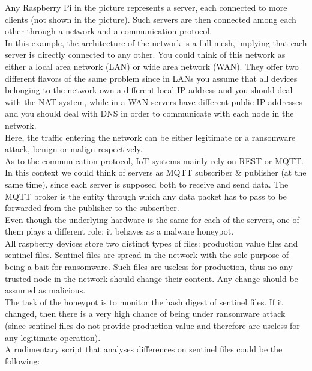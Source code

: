 \noindent Any Raspberry Pi in the picture represents a server, each connected to more clients (not shown in the picture). Such servers are then connected among each other through a network and a communication protocol.\\
In this example, the architecture of the network is a full mesh, implying that each server is directly connected to any other. You could think of this network as either a local area network (LAN) or wide area network (WAN). They offer two different flavors of the same problem since in LANs you assume that all devices belonging to the network own a different local IP address and you should deal with the NAT system, while in a WAN servers have different public IP addresses and you should deal with DNS in order to communicate with each node in the network. \\ 
Here, the traffic entering the network can be either legitimate or a ransomware attack, benign or malign respectively.\\
As to the communication protocol, IoT systems mainly rely on REST or MQTT. In this context we could think of servers as MQTT subscriber \& publisher (at the same time), since each server is supposed both to receive and send data. The MQTT broker is the entity through which any data packet has to pass to be forwarded from the publisher to the subscriber.\\
Even though the underlying hardware is the same for each of the servers, one of them plays a different role: it behaves as a malware honeypot.\\
All raspberry devices store two distinct types of files: production value files and sentinel files.
Sentinel files are spread in the network with the sole purpose of being a bait for ransomware. Such files are useless for production, thus no any trusted node in the network should change their content. Any change should be assumed as malicious.\\
The task of the honeypot is to monitor the hash digest of sentinel files. If it changed, then there is a very high chance of being under ransomware attack (since sentinel files do not provide production value and therefore are useless for any legitimate operation).\\
A rudimentary script that analyses differences on sentinel files could be the following:\\
